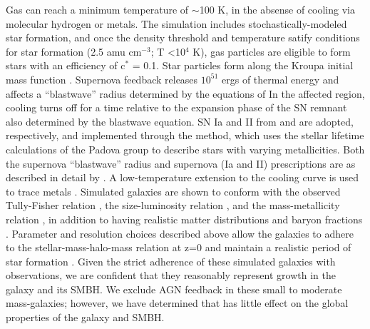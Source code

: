 \documentclass[12pt,headA,chapB]{fiskthesis}
\begin{document}
Gas can reach a minimum temperature of $\sim$100 K, in the absense of cooling via molecular hydrogen or metals. The simulation includes stochastically-modeled star formation, and once the density threshold and temperature satify conditions for star formation (2.5 amu cm$^{-3}$; T 
\textless 10$^4$ K), gas particles are eligible to form stars with an efficiency of c$^*$ = 0.1. Star particles form along the Kroupa initial mass function \citep{Kroupa2001}. Supernova feedback releases $10^{51}$ ergs of thermal energy and affects a ``blastwave'' radius determined by the equations of \cite{Ostriker1988} In the affected region, cooling turns off for a time relative to the expansion phase of the SN remnant also determined by the blastwave equation. SN Ia and II from \cite{Thielemann1986} and \cite{Woosley1986} are adopted, respectively, and implemented through the \cite{Raiteri1996} method, which uses the stellar lifetime calculations of the Padova group \citep{Alongi1993, Bressan1993, Bertelli1994} to describe stars with varying metallicities. Both the supernova ``blastwave'' radius and supernova (Ia and II) prescriptions are as described in detail by \cite{Stinson2006}. A low-temperature extension to the cooling curve is used to trace metals \citep{Bromm2001}. Simulated galaxies are shown to conform with the observed Tully-Fisher relation \citep{Governato2009}, the size-luminosity relation \citep{Brooks2011}, and the mass-metallicity relation \citep{Brooks2007}, in addition to having realistic matter distributions and baryon fractions \citep{Governato2009a,Guedes2011}. Parameter and resolution choices described above allow the galaxies to adhere to the stellar-mass-halo-mass relation at z=0 and maintain a realistic period of star formation \citep{Moster2010,Munshi2013,Brooks2007,Maiolino2008}. Given the strict adherence of these simulated galaxies with observations, we are confident that they reasonably represent growth in the galaxy and its SMBH. We exclude AGN feedback in these small to moderate mass-galaxies; however, we have determined that has little effect on the global properties of the galaxy and SMBH.
 
\end{document}
